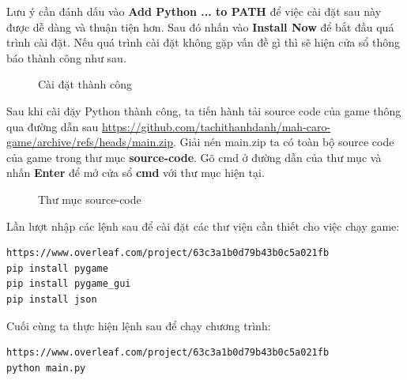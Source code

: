 Lưu ý cần đánh dấu vào \textbf{Add Python ... to PATH} để việc cài đặt sau này được dễ dàng và thuận tiện hơn. Sau đó nhấn vào \textbf{Install Now} để bắt đầu quá trình cài đặt. Nếu quá trình cài đặt không gặp vấn đề gì thì sẽ hiện cửa sổ thông báo thành công như sau.
\begin{figure}[H]
\caption{Cài đặt thành công}
\end{figure}
Sau khi cài đặy Python thành công, ta tiến hành tải source code của game thông qua đường dẫn sau \url{https://github.com/tachithanhdanh/mah-caro-game/archive/refs/heads/main.zip}.
Giải nén main.zip ta có toàn bộ source code của game trong thư mục \textbf{source-code}. Gõ cmd ở đường dẫn của thư mục và nhấn \textbf{Enter} để mở cửa sổ \textbf{cmd} với thư mục hiện tại.
\begin{figure}[H]
\caption{Thư mục source-code}
\end{figure}
Lần lượt nhập các lệnh sau để cài đặt các thư viện cần thiết cho việc chạy game:
\begin{lstlisting}https://www.overleaf.com/project/63c3a1b0d79b43b0c5a021fb
pip install pygame
pip install pygame_gui
pip install json
\end{lstlisting}
Cuối cùng ta thực hiện lệnh sau để chạy chương trình:
\begin{lstlisting}https://www.overleaf.com/project/63c3a1b0d79b43b0c5a021fb
python main.py
\end{lstlisting}